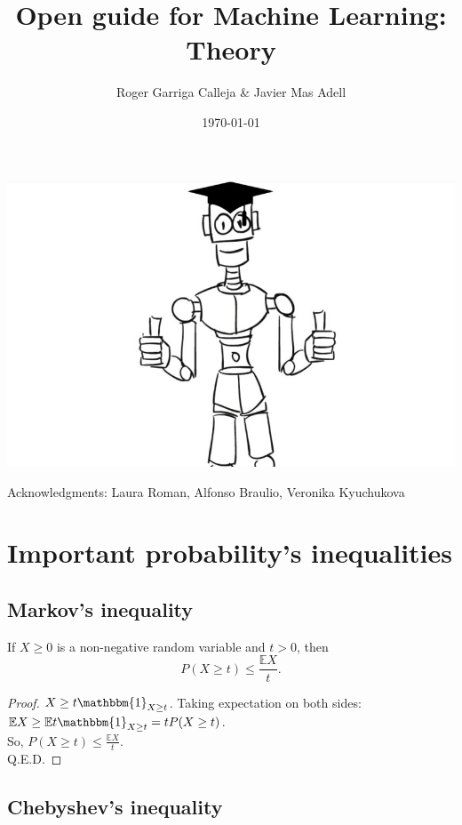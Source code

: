 \documentclass[11pt, english]{article}
\title{Open guide for Machine Learning: Theory}
\author{Roger Garriga Calleja \& Javier Mas Adell}
\date{\today}
\begin{document}
\maketitle
\vspace{1cm}
\begin{center}
	\includegraphics*[scale=0.8]{ML.jpg}
\end{center}
\vfill
\begin{center}
	\small{Acknowledgments: Laura Roman, Alfonso Braulio, Veronika Kyuchukova}
\end{center}
\newpage
\section{Important probability's inequalities}

\subsection*{Markov's inequality}

If $X\geq 0$ is a non-negative random variable and $t>0$, then
\begin{equation}
	P(X\geq t)\leq \frac{\mathbb{E}X}{t}.
\end{equation}
\begin{proof}
	$X\geq t\mathbbm{1}_{X\geq t}$. Taking expectation on both sides: $\mathbb{E}X\geq \mathbb{E}t\mathbbm{1}_{X\geq t}=tP(X\geq t)$. \\ So, $P(X\geq t) \leq \frac{\mathbb{E}X}{t}$. \\ Q.E.D.
\end{proof}

\subsection*{Chebyshev's inequality}
\end{document}
